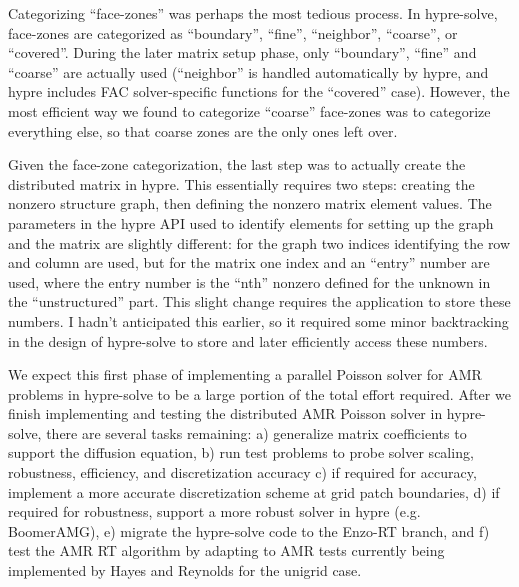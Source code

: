Categorizing ``face-zones'' was perhaps the most tedious process.  In
hypre-solve, face-zones are categorized as ``boundary'', ``fine'',
``neighbor'', ``coarse'', or ``covered''.  During the later matrix
setup phase, only ``boundary'', ``fine'' and ``coarse'' are actually
used (``neighbor'' is handled automatically by hypre, and hypre
includes FAC solver-specific functions for the ``covered'' case).
However, the most efficient way we found to categorize ``coarse''
face-zones was to categorize everything else, so that coarse zones are
the only ones left over.

Given the face-zone categorization, the last step was to actually
create the distributed matrix in hypre.  This essentially requires two
steps: creating the nonzero structure graph, then defining the nonzero
matrix element values.  The parameters in the hypre API used to
identify elements for setting up the graph and the matrix are slightly
different: for the graph two indices identifying the row and column
are used, but for the matrix one index and an ``entry'' number are
used, where the entry number is the ``nth'' nonzero defined for the
unknown in the ``unstructured'' part.  This slight change requires the
application to store these numbers.  I hadn't anticipated this
earlier, so it required some minor backtracking in the design of
hypre-solve to store and later efficiently access these numbers.

We expect this first phase of implementing a parallel Poisson solver
for AMR problems in hypre-solve to be a large portion of the total
effort required.  After we finish implementing and testing the
distributed AMR Poisson solver in hypre-solve, there are several tasks
remaining: a) generalize matrix coefficients to support the diffusion
equation, b) run test problems to probe solver scaling, robustness,
efficiency, and discretization accuracy c) if required for accuracy,
implement a more accurate discretization scheme at grid patch
boundaries, d) if required for robustness, support a more robust
solver in hypre (e.g. BoomerAMG), e) migrate the hypre-solve code to
the Enzo-RT branch, and f) test the AMR RT algorithm by adapting to
AMR tests currently being implemented by Hayes and Reynolds for the
unigrid case.

